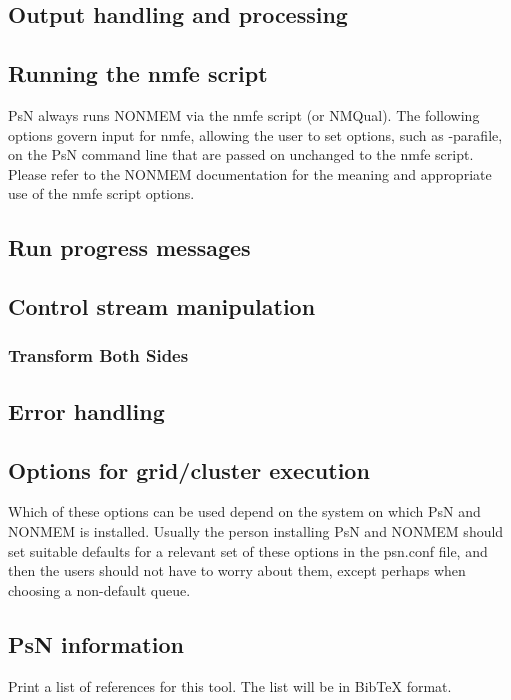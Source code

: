 \subsection{Output handling and processing}


\subsection{Running the nmfe script}
PsN always runs NONMEM via the nmfe script (or NMQual). The following options govern input for nmfe, allowing the user to set options, such as -parafile, on the PsN command line that are passed on unchanged to the nmfe script. Please refer to the NONMEM documentation for the meaning and appropriate use of the nmfe script options.


\subsection{Run progress messages}


\subsection{Control stream manipulation}

\subsubsection{Transform Both Sides}



\subsection{Error handling}



\subsection{Options for grid/cluster execution}
Which of these options can be used depend on the system on which PsN and NONMEM is installed. Usually the person installing PsN and NONMEM should set suitable defaults for a relevant set of these options in the psn.conf file, and then the users should not have to worry about them, except perhaps when choosing a non-default queue.


\subsection{PsN information}
\begin{optionlist}
Print a list of references for this tool. The list will be in BibTeX format.
\nextopt
\end{optionlist}



